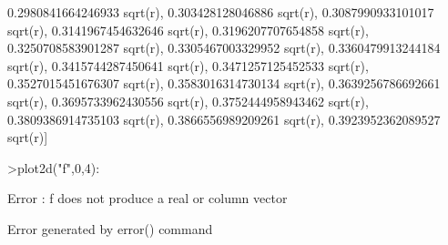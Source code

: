 \documentclass[12pt,arial,letterpaper]{book}
\begin{document}
\begin{eulercomment}
\begin{eulercomment}
\begin{eulercomment}
\begin{eulercomment}
\begin{eulercomment}
\begin{eulercomment}
\begin{eulercomment}
\begin{eulercomment}
\begin{eulercomment}
\begin{eulercomment}
\begin{eulercomment}
\begin{eulercomment}
\begin{eulercomment}
\begin{eulercomment}
\begin{eulercomment}
\begin{eulercomment}
\begin{eulercomment}
\begin{eulercomment}
\begin{eulercomment}
\begin{eulercomment}
\begin{eulercomment}
\begin{eulercomment}
\begin{euleroutput}
  0.2980841664246933 sqrt(r), 0.303428128046886 sqrt(r), 
  0.3087990933101017 sqrt(r), 0.3141967454632646 sqrt(r), 
  0.3196207707654858 sqrt(r), 0.3250708583901287 sqrt(r), 
  0.3305467003329952 sqrt(r), 0.3360479913244184 sqrt(r), 
  0.3415744287450641 sqrt(r), 0.3471257125452533 sqrt(r), 
  0.3527015451676307 sqrt(r), 0.3583016314730134 sqrt(r), 
  0.3639256786692661 sqrt(r), 0.3695733962430556 sqrt(r), 
  0.3752444958943462 sqrt(r), 0.3809386914735103 sqrt(r), 
  0.3866556989209261 sqrt(r), 0.3923952362089527 sqrt(r)]
  
\end{euleroutput}
\begin{eulerprompt}
>plot2d("f",0,4):
\end{eulerprompt}
\begin{euleroutput}
  Error : f does not produce a real or column vector
  
  Error generated by error() command
  

\end{euleroutput}
\end{eulercomment}
\end{eulercomment}
\end{eulercomment}
\end{eulercomment}
\end{eulercomment}
\end{eulercomment}
\end{eulercomment}
\end{eulercomment}
\end{eulercomment}
\end{eulercomment}
\end{eulercomment}
\end{eulercomment}
\end{eulercomment}
\end{eulercomment}
\end{eulercomment}
\end{eulercomment}
\end{eulercomment}
\end{eulercomment}
\end{eulercomment}
\end{eulercomment}
\end{eulercomment}
\end{eulercomment}
\end{document}
